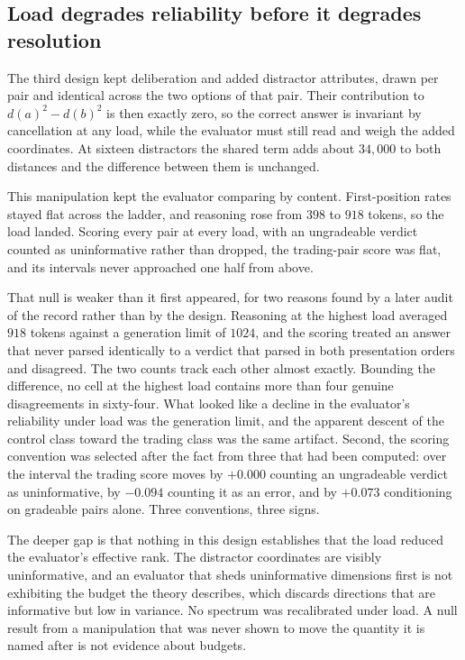\documentclass[11pt,letterpaper]{article}
\theoremstyle{plain}
\theoremstyle{definition}
\begin{document}
\subsection*{Load degrades reliability before it degrades resolution}

The third design kept deliberation and added distractor attributes, drawn per
pair and identical across the two options of that pair. Their contribution to
$d(a)^2-d(b)^2$ is then exactly zero, so the correct answer is invariant by
cancellation at any load, while the evaluator must still read and weigh the
added coordinates. At sixteen distractors the shared term adds about $34{,}000$
to both distances and the difference between them is unchanged.

This manipulation kept the evaluator comparing by content. First-position rates
stayed flat across the ladder, and reasoning rose from $398$ to $918$ tokens, so
the load landed. Scoring every pair at every load, with an ungradeable verdict
counted as uninformative rather than dropped, the trading-pair score was flat,
and its intervals never approached one half from above.

That null is weaker than it first appeared, for two reasons found by a later
audit of the record rather than by the design. Reasoning at the highest load
averaged $918$ tokens against a generation limit of $1024$, and the scoring
treated an answer that never parsed identically to a verdict that parsed in both
presentation orders and disagreed. The two counts track each other almost
exactly. Bounding the difference, no cell at the highest load contains more than
four genuine disagreements in sixty-four. What looked like a decline in the
evaluator's reliability under load was the generation limit, and the apparent
descent of the control class toward the trading class was the same artifact.
Second, the scoring convention was selected after the fact from three that had
been computed: over the interval the trading score moves by $+0.000$ counting an
ungradeable verdict as uninformative, by $-0.094$ counting it as an error, and by
$+0.073$ conditioning on gradeable pairs alone. Three conventions, three signs.

The deeper gap is that nothing in this design establishes that the load reduced
the evaluator's effective rank. The distractor coordinates are visibly
uninformative, and an evaluator that sheds uninformative dimensions first is not
exhibiting the budget the theory describes, which discards directions that are
informative but low in variance. No spectrum was recalibrated under load. A null
result from a manipulation that was never shown to move the quantity it is named
after is not evidence about budgets.
\end{document}

